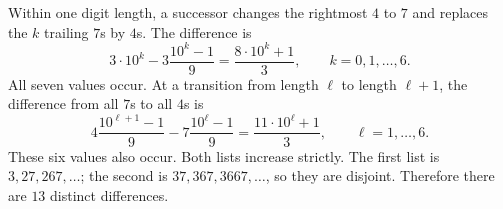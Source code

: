 Within one digit length, a successor changes the rightmost $4$ to $7$ and replaces the $k$ trailing $7$s by $4$s. The difference is
\[3\cdot10^k-3\dfrac{10^k-1}{9}=\dfrac{8\cdot10^k+1}{3},\qquad k=0,1,\ldots,6.\]
All seven values occur. At a transition from length $\ell$ to length $\ell+1$, the difference from all $7$s to all $4$s is
\[4\dfrac{10^{\ell+1}-1}{9}-7\dfrac{10^\ell-1}{9}=\dfrac{11\cdot10^\ell+1}{3},\qquad\ell=1,\ldots,6.\]
These six values also occur. Both lists increase strictly. The first list is $3,27,267,\ldots$; the second is $37,367,3667,\ldots$, so they are disjoint. Therefore there are $\boxed{13}$ distinct differences.
